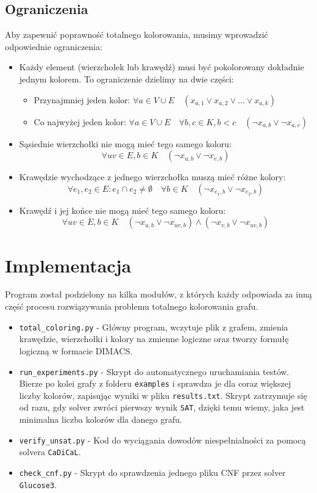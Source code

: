 \documentclass[11pt,a4paper]{article}
\theoremstyle{definition}
\begin{document}
\subsection{Ograniczenia}
Aby zapewnić poprawność totalnego kolorowania, musimy wprowadzić odpowiednie ograniczenia:
\begin{itemize}
  \item Każdy element (wierzchołek lub krawędź) musi być pokolorowany dokładnie jednym kolorem. To ograniczenie dzielimy na dwie części:
  \begin{itemize}
    \item Przynajmniej jeden kolor: $\forall a \in V \cup E \quad (x_{a,1} \lor x_{a,2} \lor \ldots \lor x_{a,k})$
    \item Co najwyżej jeden kolor: $\forall a \in V\cup E \quad \forall b, c \in K, b < c \quad (\neg x_{a,b} \lor \neg x_{a,c})$
  \end{itemize} 
  \item Sąsiednie wierzchołki nie mogą mieć tego samego koloru:
  \[
  \forall uv \in E, b \in K \quad (\neg x_{u,b} \lor \neg x_{v,b})
  \]
  \item Krawędzie wychodzące z jednego wierzchołka muszą mieć różne kolory:
  \[
  \forall e_1, e_2 \in E: e_1 \cap e_2 \neq \emptyset \quad \forall b \in K \quad (\neg x_{e_1, b} \lor \neg x_{e_2,b})
  \]
  \item Krawędź i jej końce nie mogą mieć tego samego koloru:
  \[
  \forall uv \in E, b \in K \quad (\neg x_{u,b} \lor \neg x_{uv,b}) \land (\neg x_{v,b} \lor \neg x_{uv,b})
  \]
\end{itemize}

\section{Implementacja}
Program został podzielony na kilka modułów, z których każdy odpowiada za inną część procesu rozwiązywania problemu totalnego kolorowania grafu.
\begin{itemize}
  \item \texttt{total\_coloring.py} - Główny program, wczytuje plik z grafem, zmienia krawędzie, wierzchołki i kolory na zmienne logiczne oraz tworzy formułę logiczną w formacie DIMACS.
  \item \texttt{run\_experiments.py} - Skrypt do automatycznego uruchamiania testów. Bierze po kolei grafy z folderu \texttt{examples} i sprawdza je dla coraz większej liczby kolorów, zapisując wyniki w pliku \texttt{results.txt}. Skrypt zatrzymuje się od razu, gdy solver zwróci pierwszy wynik \texttt{SAT}, dzięki temu wiemy, jaka jest minimalna liczba kolorów dla danego grafu.
  \item \texttt{verify\_unsat.py} - Kod do wyciągania dowodów niespełnialności za pomocą solvera \texttt{CaDiCaL}. 
  \item \texttt{check\_cnf.py} - Skrypt do sprawdzenia jednego pliku CNF przez solver \texttt{Glucose3}.
\end{itemize}  
\end{document}
